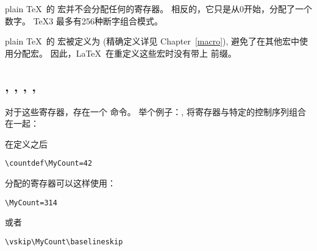 \documentclass{book}
\begin{document}
plain \TeX\ 的  宏并不会分配任何的寄存器。
相反的，它只是从0开始，分配了一个数字。
\TeX3 最多有256种断字组合模式。

plain \TeX\ 的  宏被定义为 
(精确定义详见 Chapter~\ref{macro}),
 避免了在其他宏中使用分配宏。
因此，\LaTeX\ 在重定义这些宏时没有带上  前缀。

\subsection{, , , , }

对于这些寄存器，存在一个  命令。
举个例子：, 将寄存器与特定的控制序列组合在一起：
\begin{Disp}\end{Disp}

在定义之后
\begin{verbatim}
\countdef\MyCount=42
\end{verbatim}
分配的寄存器可以这样使用：
\begin{verbatim}
\MyCount=314
\end{verbatim}
或者
\begin{verbatim}
\vskip\MyCount\baselineskip
\end{verbatim}
\end{document}
